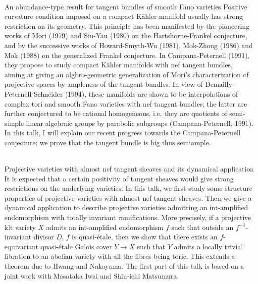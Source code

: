 \documentclass[dvipdfmx,a4paper,12pt]{article}
\theoremstyle{plain} %
\theoremstyle{definition} %
\begin{document}
\\
An abundance-type result for tangent bundles of smooth Fano varieties
\vskip3mm
Positive curvature condition imposed on a compact Kähler manifold usually has strong restriction on its geometry. This principle has been manifested by the pioneering works of Mori (1979) and Siu-Yau (1980) on the Hartshorne-Frankel conjecture, and by the successive works of Howard-Smyth-Wu (1981), Mok-Zhong (1986) and Mok (1988) on the generalized Frankel conjecture. In Campana-Peternell (1991), they propose to study compact Kähler manifolds with nef tangent bundles, aiming at giving an algbro-geometric generalization of Mori's characterization of projective spaces by ampleness of the tangent bundles. In view of Demailly-Peternell-Schneider (1994), these manifolds are shown to be interpolations of complex tori and smooth Fano varieties with nef tangent bundles; the latter are further conjectured to be rational homogeneous, i.e. they are quotients of semi-simple linear algebraic groups by parabolic subgroups (Campana-Peternell, 1991). In this talk, I will explain our recent progress towards the Campana-Peternell conjecture: we prove that the tangent bundle is big thus semiample.
\vskip6mm

\newpage 

\\
Projective varieties with almost nef tangent sheaves and its dynamical application 
\vskip3mm
It is expected that a certain positivity of tangent sheaves would give strong restrictions on the underlying varieties. In this talk, we first study some structure properties of projective varieties with almost nef tangent sheaves. Then we give a dynamical application to describe projective varieties admitting an int-amplified endomorphism with totally invariant ramifications. More precisely, if a projective klt variety $X$ admits an int-amplified endomorphism $f$ such that outside an $f^{-1}$-invariant divisor $D$, $f$ is quasi-\'etale, then we show that there exists an $f$-equivariant quasi-\'etale Galois cover $Y\to X$ such that $Y$ admits a locally trivial fibration to an abelian variety with all the fibres being toric. This extends a theorem due to Hwang and Nakayama. The first part of this talk is based on a joint work with Masataka Iwai and Shin-ichi Matsumura.

\vskip6mm
\vskip3mm
\end{document}
